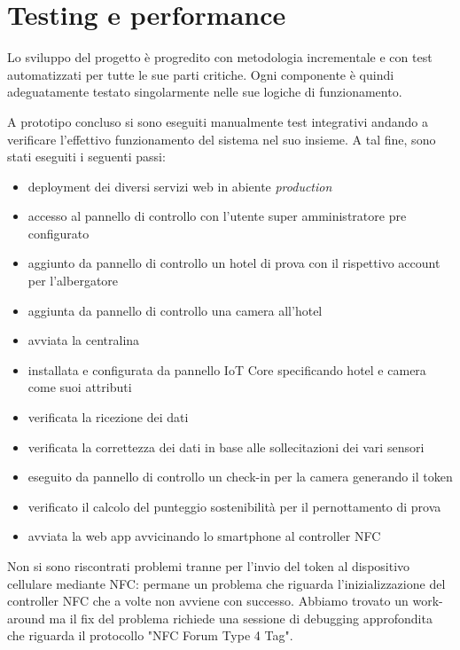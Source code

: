

\section{Testing e performance}

Lo sviluppo del progetto è progredito con metodologia incrementale e con test automatizzati per tutte le sue parti critiche. 
Ogni componente è quindi adeguatamente testato singolarmente nelle sue logiche di funzionamento.

A prototipo concluso si sono eseguiti manualmente test integrativi andando a verificare l'effettivo funzionamento del sistema nel suo insieme.
A tal fine, sono stati eseguiti i seguenti passi:
\begin{itemize}
    \item deployment dei diversi servizi web in abiente \textit{production}
    \item accesso al pannello di controllo con l'utente super amministratore pre configurato
    \item aggiunto da pannello di controllo un hotel di prova con il rispettivo account per l'albergatore
    \item aggiunta da pannello di controllo una camera all'hotel
    \item avviata la centralina
    \item installata e configurata da pannello IoT Core specificando hotel e camera come suoi attributi
    \item verificata la ricezione dei dati 
    \item verificata la correttezza dei dati in base alle sollecitazioni dei vari sensori
    \item eseguito da pannello di controllo un check-in per la camera generando il token
    \item verificato il calcolo del punteggio sostenibilità per il pernottamento di prova
    \item avviata la web app avvicinando lo smartphone al controller NFC
\end{itemize}

Non si sono riscontrati problemi tranne per l'invio del token al dispositivo cellulare mediante NFC: 
permane un problema che riguarda l'inizializzazione del controller NFC che a volte non avviene con successo. 
Abbiamo trovato un work-around ma il fix del problema richiede una sessione di debugging approfondita che riguarda 
il protocollo "NFC Forum Type 4 Tag".

